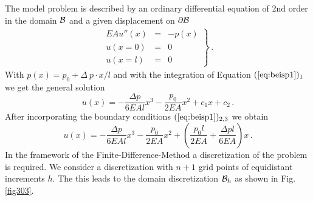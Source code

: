 The model problem is described by an ordinary differential
equation of 2nd order in the domain $\cal B$ and a given
displacement on $\partial \cal B$
%
\begin{eqnarray}
\left.
\begin{array}{rcl}
EA u''(x) & = & - p(x) \\
u(x = 0) & = & 0 \\
u(x = l) & = & 0
\end{array}
\right\} \, .
\label{eq:beisp1}
\end{eqnarray}
%
With $p(x)=p_0 + \Delta \ p \cdot x / l$ and with 
the integration of Equation $(\ref{eq:beisp1})_1$ we get 
the general solution 
%
\begin{equation}
u(x) = - \frac{\Delta p}{6 E A l} x^3 - \frac{p_0}{2 E A} x^2 
       + c_1 x + c_2 \, . 
\end{equation}
%
After incorporating the boundary conditions 
$(\ref{eq:beisp1})_{2,3}$ we obtain 
%
\begin{equation}
u(x) = - \frac{\Delta p}{6 E A l} x^3 - \frac{p_0}{2 E A} x^2 + 
  \left( \frac{p_0 l}{2 E A} + \frac{\Delta p l}{6 E A}  
  \right) x \, .
\label{eq:exaktlou}
\end{equation}
%
In the framework of the Finite-Difference-Method a
discretization of the problem is required.
We consider a discretization with $n+1$ grid points of 
equidistant increments $h$. 
The this leads to the domain discretization 
${\cal B}_h$ as shown in Fig. \ref{fig303}. 

